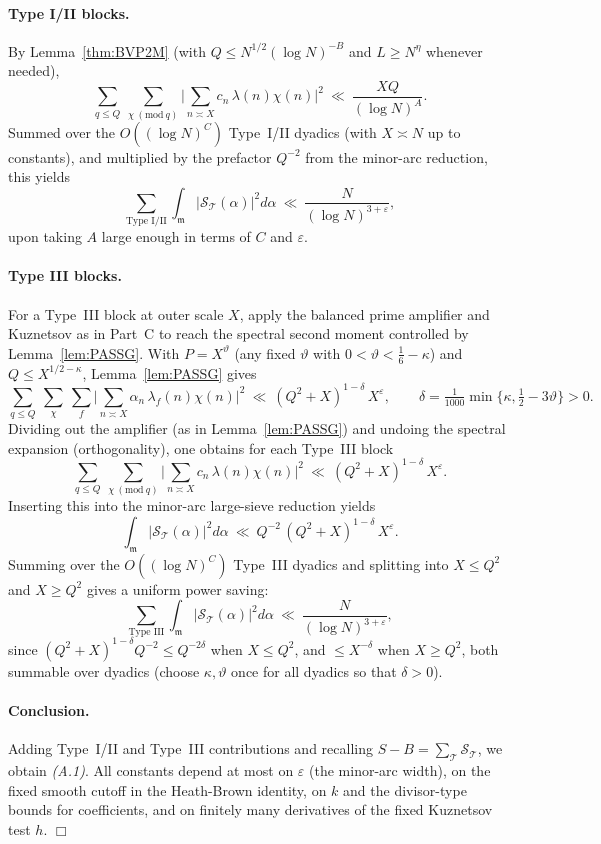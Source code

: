 \documentclass[11pt]{article}
\newcommand{\qedwhite}{\hfill \ensuremath{\Box}}
\theoremstyle{definition}
\theoremstyle{remark}
\numberwithin{equation}{part}
\begin{document}
\paragraph{Type I/II blocks.}
By Lemma~\ref{thm:BVP2M} (with $Q\le N^{1/2}(\log N)^{-B}$ and $L\ge N^{\eta}$ whenever needed),
\[
	\sum_{q\le Q}\ \sum_{\chi\ (\mathrm{mod}\ q)}
	\Big|\sum_{n\asymp X} c_n\,\lambda(n)\chi(n)\Big|^2
	\ \ll\ \frac{XQ}{(\log N)^{A}}.
\]
Summed over the $O((\log N)^C)$ Type~I/II dyadics (with $X\asymp N$ up to constants), and multiplied by the prefactor $Q^{-2}$ from the minor-arc reduction, this yields
\[
	\sum_{\text{Type I/II}}\int_{\mathfrak m}|\mathcal S_{\mathcal T}(\alpha)|^2 d\alpha
	\ \ll\ \frac{N}{(\log N)^{3+\varepsilon}},
\]
upon taking $A$ large enough in terms of $C$ and $\varepsilon$.

\paragraph{Type III blocks.}
For a Type~III block at outer scale $X$, apply the balanced prime amplifier and Kuznetsov as in Part~C to reach the spectral second moment controlled by Lemma~\ref{lem:PASSG}.
With $P=X^\vartheta$ (any fixed $\vartheta$ with $0<\vartheta<\tfrac16-\kappa$) and $Q\le X^{1/2-\kappa}$, Lemma~\ref{lem:PASSG} gives
\[
	\sum_{q\le Q}\ \sum_{\chi}\ \sum_f
	\Bigg|\sum_{n\asymp X}\alpha_n\,\lambda_f(n)\chi(n)\Bigg|^2
	\ \ll\ (Q^2+X)^{1-\delta}\,X^{\varepsilon},
	\qquad
	\delta=\tfrac{1}{1000}\min\{\kappa,\tfrac12-3\vartheta\}>0.
\]
Dividing out the amplifier (as in Lemma~\ref{lem:PASSG}) and undoing the spectral expansion (orthogonality), one obtains for each Type~III block
\[
	\sum_{q\le Q}\ \sum_{\chi\ (\mathrm{mod}\ q)}
	\Big|\sum_{n\asymp X} c_n\,\lambda(n)\chi(n)\Big|^2
	\ \ll\ (Q^2+X)^{1-\delta}\,X^{\varepsilon}.
\]
Inserting this into the minor-arc large-sieve reduction yields
\[
	\int_{\mathfrak m}|\mathcal S_{\mathcal T}(\alpha)|^2 d\alpha
	\ \ll\ Q^{-2}\,(Q^2+X)^{1-\delta}\,X^{\varepsilon}.
\]
Summing over the $O((\log N)^C)$ Type~III dyadics and splitting into $X\le Q^2$ and $X\ge Q^2$ gives a uniform power saving:
\[
	\sum_{\text{Type III}}\int_{\mathfrak m}|\mathcal S_{\mathcal T}(\alpha)|^2 d\alpha
	\ \ll\ \frac{N}{(\log N)^{3+\varepsilon}},
\]
since $(Q^2+X)^{1-\delta}Q^{-2}\le Q^{-2\delta}$ when $X\le Q^2$, and $\le X^{-\delta}$ when $X\ge Q^2$, both summable over dyadics (choose $\kappa,\vartheta$ once for all dyadics so that $\delta>0$).

\paragraph{Conclusion.}
Adding Type~I/II and Type~III contributions and recalling $S-B=\sum_{\mathcal T}\mathcal S_{\mathcal T}$, we obtain \emph{(A.1)}. All constants depend at most on $\varepsilon$ (the minor-arc width), on the fixed smooth cutoff in the Heath-Brown identity, on $k$ and the divisor-type bounds for coefficients, and on finitely many derivatives of the fixed Kuznetsov test $h$.
\qedwhite
\end{document}
